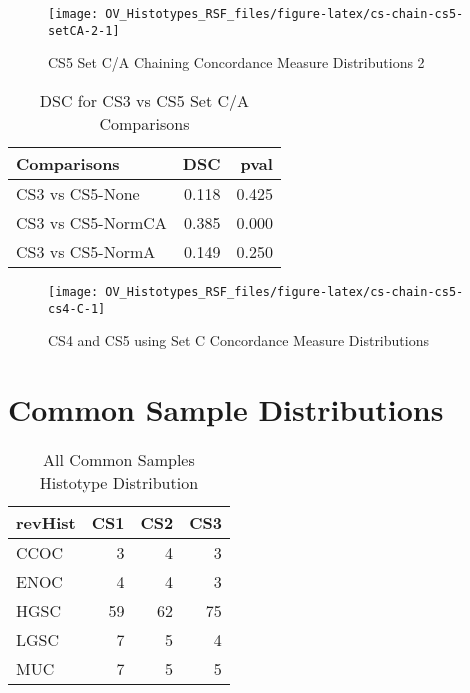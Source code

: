 \documentclass[
]{report}
\begin{document}
\begin{figure}[H]

{\centering \texttt{[image: OV\_Histotypes\_RSF\_files/figure-latex/cs-chain-cs5-setCA-2-1]} 

}

\caption{CS5 Set C/A Chaining Concordance  Measure Distributions 2}\label{fig:cs-chain-cs5-setCA-2}
\end{figure}

\begin{table}

\caption{\label{tab:cs35-CA-dsc}DSC for CS3 vs CS5 Set C/A Comparisons}
\centering
\begin{tabular}[t]{l|r|r}
\hline
Comparisons & DSC & pval\\
\hline
CS3 vs CS5-None & 0.118 & 0.425\\
\hline
CS3 vs CS5-NormCA & 0.385 & 0.000\\
\hline
CS3 vs CS5-NormA & 0.149 & 0.250\\
\hline
\end{tabular}
\end{table}

\begin{figure}[H]

{\centering \texttt{[image: OV\_Histotypes\_RSF\_files/figure-latex/cs-chain-cs5-cs4-C-1]} 

}

\caption{CS4 and CS5 using Set C Concordance Measure Distributions}\label{fig:cs-chain-cs5-cs4-C}
\end{figure}

\hypertarget{common-sample-distributions}{%
\section{Common Sample Distributions}\label{common-sample-distributions}}

\begin{table}

\caption{\label{tab:common-dist-all}All Common Samples Histotype Distribution}
\centering
\begin{tabular}[t]{l|r|r|r}
\hline
revHist & CS1 & CS2 & CS3\\
\hline
CCOC & 3 & 4 & 3\\
\hline
ENOC & 4 & 4 & 3\\
\hline
HGSC & 59 & 62 & 75\\
\hline
LGSC & 7 & 5 & 4\\
\hline
MUC & 7 & 5 & 5\\
\hline
\end{tabular}
\end{table}
\end{document}
